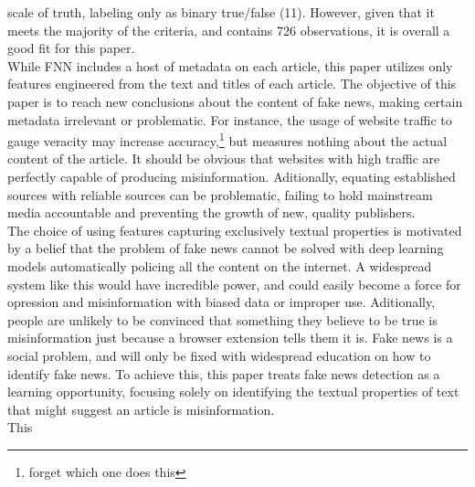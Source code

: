 \documentclass[12pt]{article}
\begin{document}
scale of truth, labeling only as binary true/false (11). However, given
that it meets the majority of the criteria, and contains 726
observations, it is overall a good fit for this paper.\\
\hspace*{0.333em}\hspace*{0.333em}\hspace*{0.333em}\hspace*{0.333em}\hspace*{0.333em}While
FNN includes a host of metadata on each article, this paper utilizes
only features engineered from the text and titles of each article. The
objective of this paper is to reach new conclusions about the content of
fake news, making certain metadata irrelevant or problematic. For
instance, the usage of website traffic to gauge veracity may increase
accuracy,\footnote{forget which one does this} but measures nothing
about the actual content of the article. It should be obvious that
websites with high traffic are perfectly capable of producing
misinformation. Aditionally, equating established sources with reliable
sources can be problematic, failing to hold mainstream media accountable
and preventing the growth of new, quality publishers.\\
\hspace*{0.333em}\hspace*{0.333em}\hspace*{0.333em}\hspace*{0.333em}\hspace*{0.333em}The
choice of using features capturing exclusively textual properties is
motivated by a belief that the problem of fake news cannot be solved
with deep learning models automatically policing all the content on the
internet. A widespread system like this would have incredible power, and
could easily become a force for opression and misinformation with biased
data or improper use. Aditionally, people are unlikely to be convinced
that something they believe to be true is misinformation just because a
browser extension tells them it is. Fake news is a social problem, and
will only be fixed with widespread education on how to identify fake
news. To achieve this, this paper treats fake news detection as a
learning opportunity, focusing solely on identifying the textual
properties of text that might suggest an article is misinformation.\\
\hspace*{0.333em}\hspace*{0.333em}\hspace*{0.333em}\hspace*{0.333em}\hspace*{0.333em}This
\end{document}
